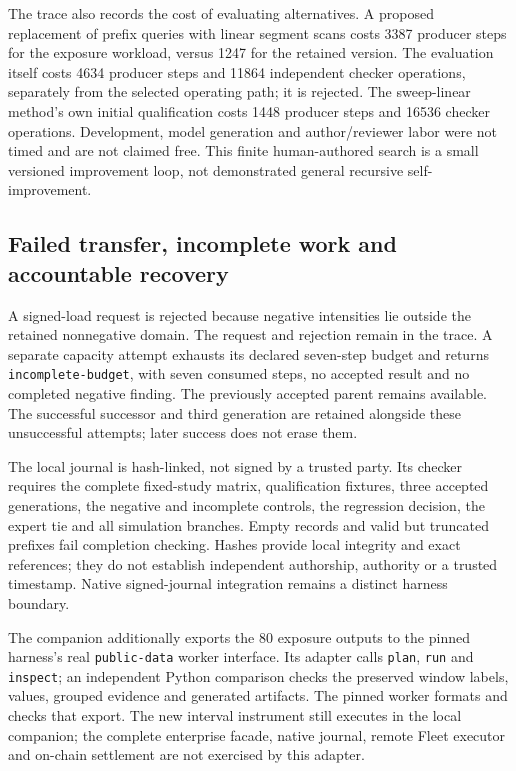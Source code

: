 \documentclass[11pt,letterpaper]{article}
\begin{document}
The trace also records the cost of evaluating alternatives. A proposed replacement of prefix queries with linear segment scans costs 3387 producer steps for the exposure workload, versus 1247 for the retained version. The evaluation itself costs 4634 producer steps and 11864 independent checker operations, separately from the selected operating path; it is rejected. The sweep-linear method's own initial qualification costs 1448 producer steps and 16536 checker operations. Development, model generation and author/reviewer labor were not timed and are not claimed free. This finite human-authored search is a small versioned improvement loop, not demonstrated general recursive self-improvement.

\subsection{Failed transfer, incomplete work and accountable recovery}
A signed-load request is rejected because negative intensities lie outside the retained nonnegative domain. The request and rejection remain in the trace. A separate capacity attempt exhausts its declared seven-step budget and returns \texttt{incomplete-budget}, with seven consumed steps, no accepted result and no completed negative finding. The previously accepted parent remains available. The successful successor and third generation are retained alongside these unsuccessful attempts; later success does not erase them.

The local journal is hash-linked, not signed by a trusted party. Its checker requires the complete fixed-study matrix, qualification fixtures, three accepted generations, the negative and incomplete controls, the regression decision, the expert tie and all simulation branches. Empty records and valid but truncated prefixes fail completion checking. Hashes provide local integrity and exact references; they do not establish independent authorship, authority or a trusted timestamp. Native signed-journal integration remains a distinct harness boundary.

The companion additionally exports the 80 exposure outputs to the pinned harness's real \texttt{public-data} worker interface. Its adapter calls \texttt{plan}, \texttt{run} and \texttt{inspect}; an independent Python comparison checks the preserved window labels, values, grouped evidence and generated artifacts. The pinned worker formats and checks that export. The new interval instrument still executes in the local companion; the complete enterprise facade, native journal, remote Fleet executor and on-chain settlement are not exercised by this adapter.
\end{document}
